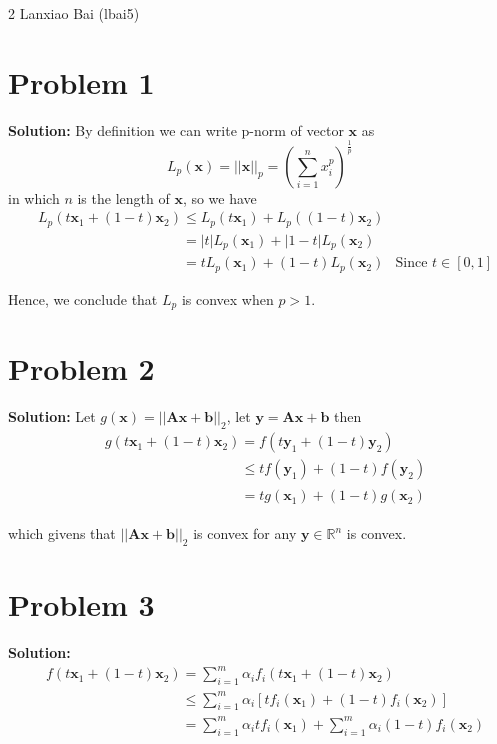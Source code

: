 \documentclass[11pt]{article}
\begin{document}
\homework
    {2}
    {Lanxiao Bai (lbai5)}
    {}

\section*{Problem 1}
\textbf{Solution:} 
 By definition we can write p-norm of vector $\mathbf{x}$ as 
 \[L_p(\mathbf{x}) = ||\mathbf{x}||_p = (\sum_{i = 1}^n x_i^p)^{\frac{1}{p}}\] in which $n$ is the length of $\mathbf{x}$, so we have
 \begin{align}
 	&L_p(t\mathbf{x}_1 + (1 - t)\mathbf{x}_2) \leq L_p(t\mathbf{x}_1) + L_p((1 - t)\mathbf{x}_2)\nonumber\\
 	&\phantom{L_p(t\mathbf{x}_1 + (1 - t)\mathbf{x}_2)} = |t|L_p(\mathbf{x}_1) + |1 - t|L_p(\mathbf{x}_2)\nonumber\\
 	&\phantom{L_p(t\mathbf{x}_1 + (1 - t)\mathbf{x}_2)} = tL_p(\mathbf{x}_1) + (1 - t)L_p(\mathbf{x}_2) & \text{Since $t \in [0, 1]$}\nonumber
 \end{align}
 
 Hence, we conclude that $L_p$ is convex when $p > 1$.
 
\section*{Problem 2}
\textbf{Solution:} 
	Let $g(\mathbf{x}) = ||\mathbf{Ax} + \mathbf{b}||_2$, let $\mathbf{y} = \mathbf{Ax} + \mathbf{b}$ then
	\begin{align}
		&g(t\mathbf{x}_1 + (1 - t)\mathbf{x}_2) = f(t\mathbf{y}_1 + (1 - t)\mathbf{y}_2)\nonumber\\
		&\phantom{f(t\mathbf{y}_1 + (1 - t)\mathbf{y}_2)} \leq tf(\mathbf{y}_1) + (1 - t)f(\mathbf{y}_2)\nonumber\\
		&\phantom{f(t\mathbf{y}_1 + (1 - t)\mathbf{y}_2)} = tg(\mathbf{x}_1) + (1 - t)g(\mathbf{x}_2)\nonumber
	\end{align}
	
	which givens that $||\mathbf{Ax} + \mathbf{b}||_2$ is convex for any $\mathbf{y} \in \mathbb{R}^n$ is convex.
	
\section*{Problem 3}
\textbf{Solution:} 
	\begin{align}
		&f(t\mathbf{x}_1 + (1 - t)\mathbf{x}_2) = \sum_{i = 1}^m \alpha_if_i(t\mathbf{x}_1 + (1 - t)\mathbf{x}_2)\nonumber\\
		&\phantom{f(t\mathbf{x}_1 + (1 - t)\mathbf{x}_2)} \leq \sum_{i = 1}^m \alpha_i[tf_i(\mathbf{x}_1) + (1 - t)f_i(\mathbf{x}_2)]\nonumber\\
		&\phantom{f(t\mathbf{x}_1 + (1 - t)\mathbf{x}_2)} = \sum_{i = 1}^m \alpha_itf_i(\mathbf{x}_1) + \sum_{i = 1}^m \alpha_i(1 - t)f_i(\mathbf{x}_2)\nonumber
	\end{align}
	
\end{document}
